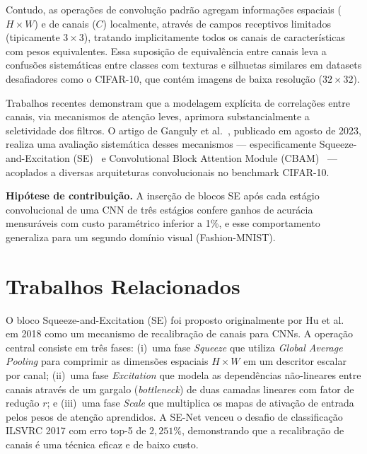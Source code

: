 \documentclass[runningheads]{llncs}
\begin{document}
Contudo, as operações de convolução padrão agregam informações espaciais
($H \times W$) e de canais ($C$) localmente, através de campos
receptivos limitados (tipicamente $3 \times 3$), tratando implicitamente
todos os canais de características com pesos equivalentes. Essa
suposição de equivalência entre canais leva a confusões sistemáticas
entre classes com texturas e silhuetas similares em datasets desafiadores
como o CIFAR-10, que contém imagens de baixa resolução ($32 \times 32$).

Trabalhos recentes demonstram que a modelagem explícita de correlações
entre canais, via mecanismos de atenção leves, aprimora substancialmente
a seletividade dos filtros. O artigo de Ganguly et
al.~\cite{ref_ganguly2023}, publicado em agosto de 2023, realiza uma
avaliação sistemática desses mecanismos --- especificamente
Squeeze-and-Excitation (SE)~\cite{ref_senet} e Convolutional Block
Attention Module (CBAM)~\cite{ref_cbam} --- acoplados a diversas
arquiteturas convolucionais no benchmark CIFAR-10.

\textbf{Hipótese de contribuição.} A inserção de blocos SE após cada
estágio convolucional de uma CNN de três estágios confere ganhos de
acurácia mensuráveis com custo paramétrico inferior a 1\%, e esse
comportamento generaliza para um segundo domínio visual (Fashion-MNIST).

\section{Trabalhos Relacionados}

O bloco Squeeze-and-Excitation (SE) foi proposto originalmente por Hu et
al.~\cite{ref_senet} em 2018 como um mecanismo de recalibração de
canais para CNNs. A operação central consiste em três fases: (i)~uma
fase \textit{Squeeze} que utiliza \textit{Global Average Pooling} para
comprimir as dimensões espaciais $H \times W$ em um descritor escalar
por canal; (ii)~uma fase \textit{Excitation} que modela as dependências
não-lineares entre canais através de um gargalo (\textit{bottleneck}) de
duas camadas lineares com fator de redução $r$; e (iii)~uma fase
\textit{Scale} que multiplica os mapas de ativação de entrada pelos
pesos de atenção aprendidos. A SE-Net venceu o desafio de classificação
ILSVRC 2017 com erro top-5 de $2{,}251\%$, demonstrando que a
recalibração de canais é uma técnica eficaz e de baixo custo.
\end{document}

